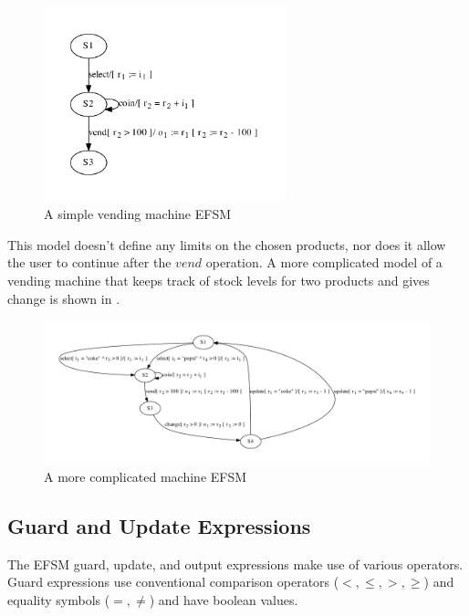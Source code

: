 \begin{figure}[h]
\begin{center}
\includegraphics[width=7cm]{figures/efsm/vend-real.pdf}
\caption{A simple vending machine EFSM}
\label{fig:vendsimple}
\end{center}
\end{figure}

This model doesn't define any limits on the chosen products, nor does it allow the user to continue after the $vend$ operation. A more complicated model of a vending machine that keeps track of stock levels for two products and gives change is shown in .

\begin{figure}[h]
\begin{center}
\includegraphics[width=13cm]{figures/efsm/vend-complicated.pdf}
\caption{A more complicated machine EFSM}
\label{fig:vendcomplicated}
\end{center}
\end{figure}

\subsection{Guard and Update Expressions}
\label{Expressions}

The EFSM guard, update, and output expressions make use of various operators. Guard expressions use conventional comparison operators ($<, \leq, >, \geq$) and equality symbols ($=, \neq$) and have boolean values.

